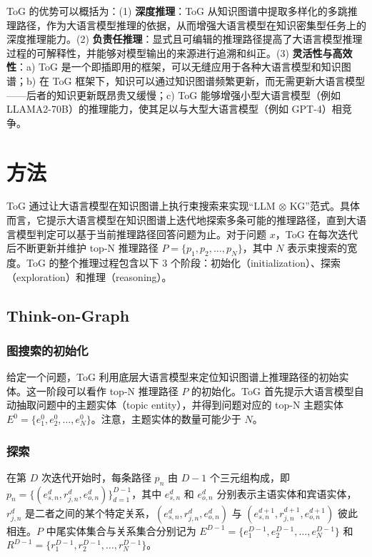 \documentclass[11pt,UTF8,fontset=fandol]{ctexart}
\newcommand{\oxkg}{\ensuremath{\otimes}}
\begin{document}
ToG 的优势可以概括为：(1) \textbf{深度推理}：ToG 从知识图谱中提取多样化的多跳推理路径，作为大语言模型推理的依据，从而增强大语言模型在知识密集型任务上的深度推理能力。(2) \textbf{负责任推理}：显式且可编辑的推理路径提高了大语言模型推理过程的可解释性，并能够对模型输出的来源进行追溯和纠正。(3) \textbf{灵活性与高效性}：a) ToG 是一个即插即用的框架，可以无缝应用于各种大语言模型和知识图谱；b) 在 ToG 框架下，知识可以通过知识图谱频繁更新，而无需更新大语言模型——后者的知识更新既昂贵又缓慢；c) ToG 能够增强小型大语言模型（例如 LLAMA2-70B）的推理能力，使其足以与大型大语言模型（例如 GPT-4）相竞争。

\section{方法}

ToG 通过让大语言模型在知识图谱上执行束搜索来实现“LLM \oxkg{} KG”范式。具体而言，它提示大语言模型在知识图谱上迭代地探索多条可能的推理路径，直到大语言模型判定可以基于当前推理路径回答问题为止。对于问题 $x$，ToG 在每次迭代后不断更新并维护 top-N 推理路径 $P = \{p_1, p_2, \dots, p_N\}$，其中 $N$ 表示束搜索的宽度。ToG 的整个推理过程包含以下 3 个阶段：初始化（initialization）、探索（exploration）和推理（reasoning）。

\subsection{Think-on-Graph}

\subsubsection{图搜索的初始化}

给定一个问题，ToG 利用底层大语言模型来定位知识图谱上推理路径的初始实体。这一阶段可以看作 top-N 推理路径 $P$ 的初始化。ToG 首先提示大语言模型自动抽取问题中的主题实体（topic entity），并得到问题对应的 top-N 主题实体 $E^0 = \{e_1^0, e_2^0, \dots, e_N^0\}$。注意，主题实体的数量可能少于 $N$。

\subsubsection{探索}

在第 $D$ 次迭代开始时，每条路径 $p_n$ 由 $D-1$ 个三元组构成，即 $p_n = \{(e_{s,n}^d, r_{j,n}^d, e_{o,n}^d)\}_{d=1}^{D-1}$，其中 $e_{s,n}^d$ 和 $e_{o,n}^d$ 分别表示主语实体和宾语实体，$r_{j,n}^d$ 是二者之间的某个特定关系，$(e_{s,n}^d, r_{j,n}^d, e_{o,n}^d)$ 与 $(e_{s,n}^{d+1}, r_{j,n}^{d+1}, e_{o,n}^{d+1})$ 彼此相连。$P$ 中尾实体集合与关系集合分别记为 $E^{D-1} = \{e_1^{D-1}, e_2^{D-1}, \dots, e_N^{D-1}\}$ 和 $R^{D-1} = \{r_1^{D-1}, r_2^{D-1}, \dots, r_N^{D-1}\}$。
\end{document}

